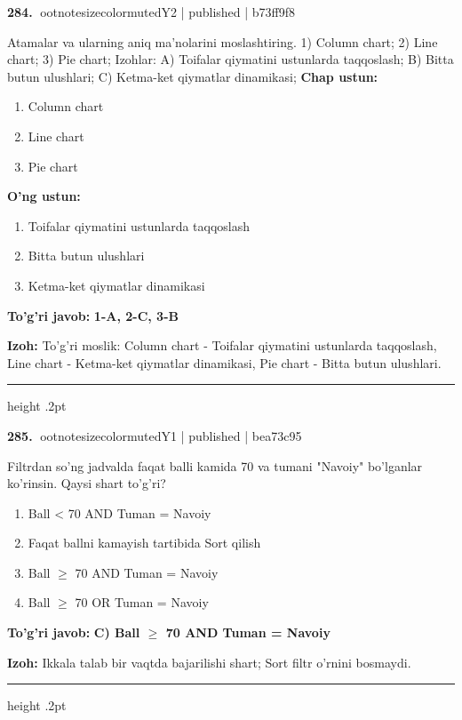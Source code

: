\documentclass[10pt,a4paper]{article}
\begin{document}
\textbf{\color{ink}284.} {ootnotesizecolor{muted}Y2 | published | b73ff9f8}
\par
Atamalar va ularning aniq ma'nolarini moslashtiring.  1) Column chart;  2) Line chart;  3) Pie chart;  Izohlar: A) Toifalar qiymatini ustunlarda taqqoslash;  B) Bitta butun ulushlari;  C) Ketma-ket qiymatlar dinamikasi;
\textbf{Chap ustun:}\begin{enumerate}[label=\arabic*),leftmargin=9mm]
\item Column chart
\item Line chart
\item Pie chart
\end{enumerate}
\textbf{O'ng ustun:}\begin{enumerate}[label=\Alph*),leftmargin=9mm]
\item Toifalar qiymatini ustunlarda taqqoslash
\item Bitta butun ulushlari
\item Ketma-ket qiymatlar dinamikasi
\end{enumerate}
\begin{tcolorbox}[enhanced,breakable,colback=teal!4,colframe=teal!55!black,boxrule=0.45pt,arc=1.2mm,left=2.8mm,right=2.8mm,top=2mm,bottom=2mm]
\textbf{\color{teal}To'g'ri javob:} \textbf{1-A, 2-C, 3-B}
\par\smallskip
\textbf{Izoh:} To'g'ri moslik: Column chart - Toifalar qiymatini ustunlarda taqqoslash, Line chart - Ketma-ket qiymatlar dinamikasi, Pie chart - Bitta butun ulushlari.
\end{tcolorbox}
\vspace{2mm}\hrule height .2pt\vspace{2mm}

\textbf{\color{ink}285.} {ootnotesizecolor{muted}Y1 | published | bea73c95}
\par
Filtrdan so'ng jadvalda faqat balli kamida 70 va tumani "Navoiy" bo'lganlar ko'rinsin. Qaysi shart to'g'ri?
\begin{enumerate}[label=\Alph*),leftmargin=9mm]
\item Ball \textless{} 70 AND Tuman = Navoiy
\item Faqat ballni kamayish tartibida Sort qilish
\item Ball \ensuremath{\geq} 70 AND Tuman = Navoiy
\item Ball \ensuremath{\geq} 70 OR Tuman = Navoiy
\end{enumerate}
\begin{tcolorbox}[enhanced,breakable,colback=teal!4,colframe=teal!55!black,boxrule=0.45pt,arc=1.2mm,left=2.8mm,right=2.8mm,top=2mm,bottom=2mm]
\textbf{\color{teal}To'g'ri javob:} \textbf{C) Ball \ensuremath{\geq} 70 AND Tuman = Navoiy}
\par\smallskip
\textbf{Izoh:} Ikkala talab bir vaqtda bajarilishi shart; Sort filtr o'rnini bosmaydi.
\end{tcolorbox}
\vspace{2mm}\hrule height .2pt\vspace{2mm}
\end{document}
